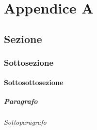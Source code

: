 
\chapter{Appendice A}
	
\section{Sezione} 

\subsection{Sottosezione}

\subsubsection{Sottosottosezione}

\paragraph{Paragrafo}

\subparagraph{Sottoparagrafo}


		
	